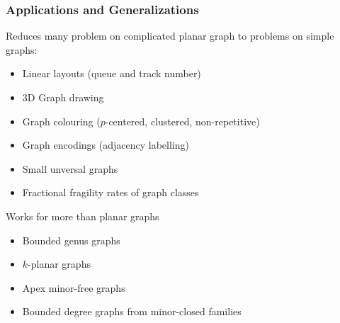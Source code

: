 \documentclass[xcolor=dvipsnames]{beamer}
\begin{document}
\begin{frame}
\frametitle{Applications and Generalizations}

Reduces many problem on complicated planar graph to problems on simple graphs:
\begin{itemize}
    \item Linear layouts (queue and track number)
    \item 3D Graph drawing
    \item Graph colouring ($p$-centered, clustered, non-repetitive)
    \item Graph encodings (adjacency labelling)
    \item Small unversal graphs
    \item Fractional fragility rates of graph classes
\end{itemize}
Works for more than planar graphs
\begin{itemize}
    \item Bounded genus graphs
    \item $k$-planar graphs
    \item Apex minor-free graphs
    \item Bounded degree graphs from minor-closed families
\end{itemize}
\end{frame}
\end{document}
